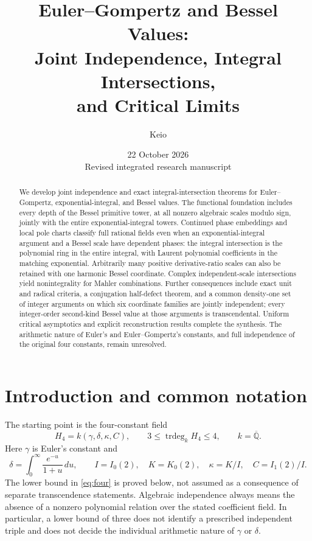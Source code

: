 \documentclass[11pt]{article}
\title{Euler--Gompertz and Bessel Values:\\Joint Independence, Integral Intersections,\\and Critical Limits}
\author{Keio}
\date{22 October 2026\\\small Revised integrated research manuscript}
\theoremstyle{definition}
\theoremstyle{remark}
\newcommand{\trdeg}{\operatorname{trdeg}}
\begin{document}
\maketitle
\begin{abstract}
We develop joint independence and exact integral-intersection theorems
for Euler--Gompertz, exponential-integral, and Bessel values. The functional
foundation includes every depth of the Bessel primitive tower, at all
nonzero algebraic scales modulo sign, jointly with the entire
exponential-integral towers. Continued phase embeddings and local pole
charts classify full rational fields even when an exponential-integral
argument and a Bessel scale have dependent phases: the integral
intersection is the polynomial ring in the entire integral, with Laurent
polynomial coefficients in the matching exponential. Arbitrarily many
positive derivative-ratio scales can also be retained with one harmonic
Bessel coordinate. Complex independent-scale intersections yield
nonintegrality for Mahler combinations. Further consequences include exact
unit and radical criteria, a conjugation half-defect theorem, and a common
density-one set of integer arguments on which six coordinate families
are jointly independent; every integer-order second-kind Bessel value
at those arguments is transcendental. Uniform critical asymptotics and
explicit reconstruction results complete the synthesis. The arithmetic
nature of Euler's and Euler--Gompertz's constants, and full independence
of the original four constants, remain unresolved.
\end{abstract}
\clearpage
\begingroup\small
\makeatletter
\renewcommand{\l@section}{\@dottedtocline{1}{0em}{2.2em}}
\renewcommand{\l@part}{\@dottedtocline{0}{0em}{2.2em}}
\makeatother
\tableofcontents
\endgroup
\clearpage

\section{Introduction and common notation}
The starting point is the four-constant field
\begin{equation}\label{eq:four}
 H_4=k(\gamma,\delta,\kappa,C),\qquad
 3\le\trdeg_k H_4\le4,\qquad k=\overline{\mathbb Q}.
\end{equation}
Here $\gamma$ is Euler's constant and
\[
 \delta=\int_0^\infty\frac{e^{-u}}{1+u}\,du,\qquad
 I=I_0(2),\quad K=K_0(2),\quad
 \kappa=K/I,\quad C=I_1(2)/I.
\]
The lower bound in \eqref{eq:four} is proved below, not assumed as a
consequence of separate transcendence statements. Algebraic independence
always means the absence of a nonzero polynomial relation over the stated
coefficient field. In particular, a lower bound of three does not identify
a prescribed independent triple and does not decide the individual
arithmetic nature of $\gamma$ or $\delta$.
\end{document}
